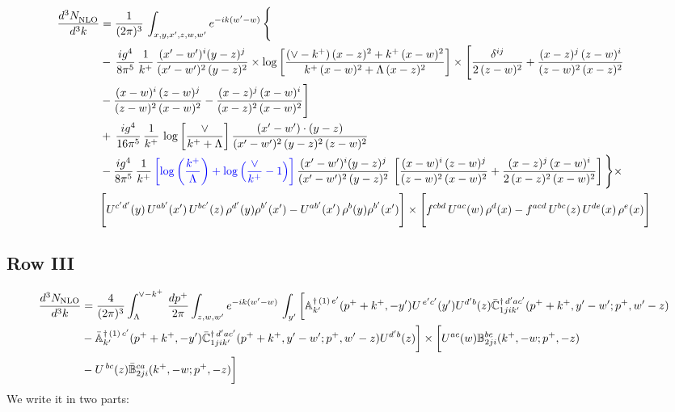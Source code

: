 \documentclass[9pt]{article}
\def\mf#1{\mathbb{#1}}
\numberwithin{equation}{section}
\begin{document}
\begin{align}
     \frac{d^{3}N_{\rm NLO}^{\rm}}{d^{3}k}  & =  \frac{1}{(2\pi)^{3}}\, \int_{x,y,x',z,w,w^{\prime}} e^{-ik(w^{\prime}-w)}\, \Bigg\{\notag \\ & -\,\frac{ig^{4}}{8\pi^{5}}\,\frac{1}{k^{+}}\,\frac{(x'-w')^{i}(y-z)^{j}}{(x'-w')^{2}\,(y-z)^{2}}\times \log{\left[\frac{(\vee-k^{+})\,(x-z)^{2}+k^{+}\,(x-w)^{2}}{k^{+}\,(x-w)^{2}+\Lambda\, (x-z)^{2}}\right]}\times \Bigg[\frac{\delta^{ij}}{2\,(z-w)^{2}}+\frac{(x-z)^{j}\,(z-w)^{i}}{(z-w)^{2}\,(x-z)^{2}}\notag \\ & -\frac{(x-w)^{i}\,(z-w)^{j}}{(z-w)^{2}\,(x-w)^{2}}-\frac{(x-z)^{j}\,(x-w)^{i}}{(x-z)^{2}\,(x-w)^{2}}\Bigg]\notag \\ & +\,\frac{ig^{4}}{16\pi^{5}}\,\frac{1}{k^{+}}\,\log{\left[\frac{\vee}{k^{+}+\Lambda}\right]}\, \frac{(x'-w')\cdot (y-z)}{(x'-w')^{2}\,(y-z)^{2}\,(z-w)^{2}}\notag \\ & -\frac{ig^{4}}{8\pi^{5}}\,\frac{1}{k^{+}}\,{\color{blue}\left[\log{\left(\frac{k^{+}}{\Lambda}\right)}+\log{\left(\frac{\vee}{k^{+}}-1\right)}\right]}\,\frac{(x'-w')^{i}(y-z)^{j}}{(x'-w')^{2}\,(y-z)^{2}}\,\left[\frac{(x-w)^{i}\,(z-w)^{j}}{(z-w)^{2}\,(x-w)^{2}}+\frac{(x-z)^{j}\,(x-w)^{i}}{2\,(x-z)^{2}\, (x-w)^{2}}\right]\Bigg\}\times \notag \\ & \Bigg[U^{c'd'}(y)\,U^{ab'}(x')\,U^{bc'}(z)\,\rho^{d'}(y)\rho^{b'}(x')-U^{ab'}(x')\,\rho^{b}(y)\rho^{b'}(x')\Bigg]\times\Bigg[f^{cbd}\,U^{ac}(w)\,\rho^{d}(x)-f^{acd}\, U^{bc}(z)\,U^{de}(x)\,\rho^{e}(x)\Bigg]
\end{align}
 \subsection{Row III\,}
 \begin{align}
    \frac{d^{3}N_{\rm NLO}}{d^{3}k} & =   \frac{4}{(2\pi)^{3}} \int_{\Lambda}^{\vee -k^{+}}\, \frac{dp^{+}}{2\pi}\int_{z,w,w^{\prime}} e^{-ik(w^{\prime}-w)}\,\int_{y^{\prime}}\bigg[\mf{A}^{\dagger\, (1)\,e^{\prime}}_{k^{\prime}}(p^{+}+k^{+},-y^{\prime})U^{\, e^{\prime}c^{\prime}}(y^{\prime})U^{d^{\prime}b}(z) \Bar{\mf{C}}^{\dagger\, d^{\prime}ac^{\prime}}_{1jik^{\prime}}(p^{+}+k^{+},y^{\prime}-w^{\prime}; p^{+},w^{\prime}-z)\notag \\ &  -\Bar{\mf{A}}^{\dagger\, (1)\,c^{\prime}}_{k^{\prime}}(p^{+}+k^{+},-y^{\prime}) \Bar{\mf{C}}^{\dagger\, d^{\prime}ac^{\prime}}_{1jik^{\prime}}(p^{+}+k^{+},y^{\prime}-w^{\prime}; p^{+},w^{\prime}-z)U^{d^{\prime}b}(z)\bigg] \times \bigg[U^{ac}(w) \mf{B}^{bc}_{2ji}(k^{+},-w;p^{+},-z)\notag \\ &  -U^{\, bc}(z)\Bar{\mf{B}}^{ca}_{2ji}(k^{+},-w; p^{+},-z)\bigg]\nonumber
\end{align}
We write it in two parts:
\end{document}
